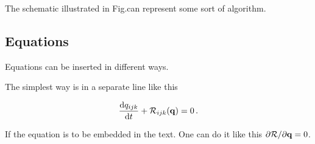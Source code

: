 The schematic illustrated in Fig.can represent some sort of algorithm.
\iffalse
\begin{figure}[!htb]
  \centering
  \scriptsize
  \setlength{\unitlength}{0.9cm}
  \begin{picture}(8.5,6)
    \linethickness{0.3mm}

    \put(3,6){\vector(0,-1){1}}
    \put(3.5,5.4){$\bf \alpha$}
    \put(3,4.5){\oval(6,1){}}
    \put(0.3,4.4){Grid Generation: \quad ${\bf x} = {\bf x}\left({\bf \alpha}\right)$}

    \put(3,4){\vector(0,-1){1}}
    \put(3.5,3.4){$\bf x$}
    \put(3,2.5){\oval(6,1){}}
    \put(0.3,2.4){Flow Solver: \quad ${\cal R}\left({\bf x},{\bf q}\left({\bf x}\right)\right) = 0$}

    \put(6.0,2.5){\vector(1,0){1}}
    \put(6.4,3){$Y_1$}

    \put(3,2){\vector(0,-1){1}}
    \put(3.5,1.4){$\bf q$}
    \put(3,0.5){\oval(6,1){}}
    \put(0.3,0.4){Structural Solver: \quad ${\cal M}\left({\bf x},{\bf q}\left({\bf x}\right)\right) = 0$}

    \put(6.0,0.5){\vector(1,0){1}}
    \put(6.4,1){$Y_2$}

    \put(7.0,0){\framebox(1.6,5){}}
    \put(7.1,2.5){Optimizer}
    \put(7.8,5){\line(0,1){1}}
    \put(7.8,6){\line(-1,0){4.8}}
  \end{picture}
  \caption{Schematic of some algorithm.}
  \label{fig:algorithm}
\end{figure}
\fi

\subsection{Equations}
\label{subsection:equations}

Equations can be inserted in different ways.

The simplest way is in a separate line like this

\begin{equation}
  \frac{{\rm d} q_{ijk}}{{\rm d} t} + {\cal R}_{ijk}({\bf q}) = 0 \,.
\label{eq:ode}
\end{equation}

If the equation is to be embedded in the text. One can do it like this ${\partial {\cal R}}/{\partial {\bf q}}=0$.

